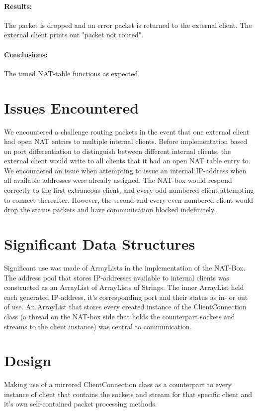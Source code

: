 \documentclass[12pt, a4paper]{article}
\begin{document}
\paragraph{Results:}
The packet is dropped and an error packet is returned to the external client. The external client prints out "packet not routed".
\paragraph{Conclusions:}
The timed NAT-table functions as expected.

\section{Issues Encountered}
We encountered a challenge routing packets in the event that one external client had open NAT entries to multiple internal clients. Before implementation based on port differentiation to distinguish between different internal clients, the external client would write to all clients that it had an open NAT table entry to.
We encountered an issue when attempting to issue an internal IP-address when all available addresses were already assigned. The NAT-box would respond correctly to the first extraneous client, and every odd-numbered client attempting to connect thereafter. However, the second and every even-numbered client would drop the status packets and have communication blocked indefinitely.

\section{Significant Data Structures}
Significant use was made of ArrayLists in the implementation of the NAT-Box. The address pool that stores IP-addresses available to internal clients was constructed as an ArrayList of ArrayLists of Strings. The inner ArrayList held each generated IP-address, it's corresponding port and their status as in- or out of use.
An ArrayList that stores every created instance of the ClientConnection class (a thread on the NAT-box side that holds the counterpart sockets and streams to the client instance) was central to communication.

\section{Design}
Making use of a mirrored ClientConnection class as a counterpart to every instance of client that contains the sockets and stream for that specific client and it's own self-contained packet processing methods.
\end{document}
